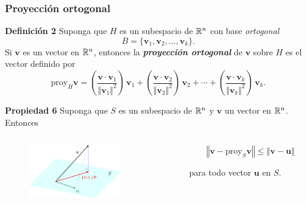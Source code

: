 {\nologo
\begin{frame}\frametitle{Proyección ortogonal}

\vspace{-3mm}	
\begin{defi}{\textbf{Definición 2}}
	\justifying
	Suponga que $H$ es un subespacio de $\mathbb{R}^n$ con base \textit{ortogonal} 
	\[
	B = \{ \mathbf{v}_1, \mathbf{v}_2, \hdots, \mathbf{v}_k\}.
	\]
	Si $\mathbf{v}$ es un vector en $\mathbb{R}^n$, entonces la \textbf{\textit{proyección ortogonal}} de $\mathbf{v}$ sobre $H$
	es el vector definido por
	\[
	\text{proy}_H \mathbf{v} = \left( \frac{\mathbf{v}\cdot \mathbf{v}_1}{\Vert \mathbf{v}_1 \Vert^2} \right)\, \mathbf{v}_1 + 
	\left( \frac{\mathbf{v}\cdot \mathbf{v}_2}{\Vert \mathbf{v}_2 \Vert^2} \right)\, \mathbf{v}_2 + \cdots 
	+ \left( \frac{\mathbf{v}\cdot \mathbf{v}_k}{\Vert \mathbf{v}_k \Vert^2} \right)\, \mathbf{v}_k.
	\]
	
	\vspace{-1mm}
\end{defi}	

\vspace{-1mm}

\begin{prop}{\textbf{Propiedad 6}}
	\justifying
	Suponga que $S$ es un subespacio de $\mathbb{R}^n$ y $\mathbf{v}$ un vector en $\mathbb{R}^n$. Entonces 
	
	\vspace{-5mm}	
	\begin{columns}
		\begin{column}{0.4\textwidth}
			\begin{figure}
				\centering
				\includegraphics[width=4cm]{imagenes/proyeccion}
			\end{figure}
		\end{column}
		\begin{column}{0.5\textwidth}  %

			\vspace{2mm}
			\[
			\left\Vert \mathbf{v} - \text{proy}_S \mathbf{v} \right\Vert \leq 
			\left\Vert \mathbf{v} - \mathbf{u} \right\Vert
			\]		
			
			\vspace{4mm}
			para todo vector $\mathbf{u}$ en $S$.
		\end{column}
	\end{columns}
\end{prop}	
	
\end{frame}
}

